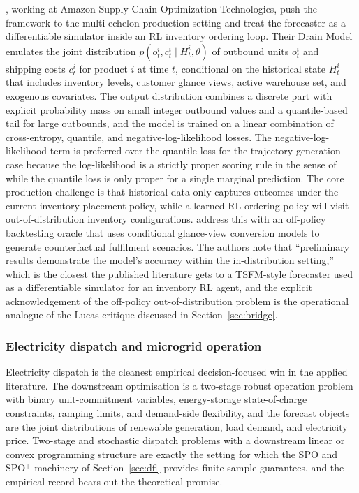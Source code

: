 \citet{Amazon2025}, working at Amazon Supply Chain Optimization
Technologies, push the framework to the multi-echelon production setting and
treat the forecaster as a differentiable simulator inside an RL inventory
ordering loop. Their Drain Model emulates the joint distribution
$p(o^i_t, c^i_t \mid H^i_t, \theta)$ of outbound units $o^i_t$ and shipping
costs $c^i_t$ for product $i$ at time $t$, conditional on the historical
state $H^i_t$ that includes inventory levels, customer glance views, active
warehouse set, and exogenous covariates. The output distribution combines a
discrete part with explicit probability mass on small integer outbound values
and a quantile-based tail for large outbounds, and the model is trained on a
linear combination of cross-entropy, quantile, and negative-log-likelihood
losses. The negative-log-likelihood term is preferred over the quantile loss
for the trajectory-generation case because the log-likelihood is a strictly
proper scoring rule in the sense of \citet{GneitingRaftery2007} while the
quantile loss is only proper for a single marginal prediction. The core
production challenge is that historical data only captures outcomes under the
current inventory placement policy, while a learned RL ordering policy will
visit out-of-distribution inventory configurations. \citet{Amazon2025} address
this with an off-policy backtesting oracle that uses conditional glance-view
conversion models to generate counterfactual fulfilment scenarios. The
authors note that ``preliminary results demonstrate the model's accuracy
within the in-distribution setting,'' which is the closest the published
literature gets to a TSFM-style forecaster used as a differentiable simulator
for an inventory RL agent, and the explicit acknowledgement of the
off-policy out-of-distribution problem is the operational analogue of the
Lucas critique discussed in Section~\ref{sec:bridge}.

\subsubsection{Electricity dispatch and microgrid operation}
\label{sec:app_electricity}

Electricity dispatch is the cleanest empirical decision-focused win in the
applied literature. The downstream optimisation is a two-stage robust
operation problem with binary unit-commitment variables, energy-storage
state-of-charge constraints, ramping limits, and demand-side flexibility, and
the forecast objects are the joint distributions of renewable generation,
load demand, and electricity price. Two-stage and stochastic dispatch
problems with a downstream linear or convex programming structure are exactly
the setting for which the SPO and SPO$^+$ machinery of
Section~\ref{sec:dfl} provides finite-sample guarantees, and the empirical
record bears out the theoretical promise.

